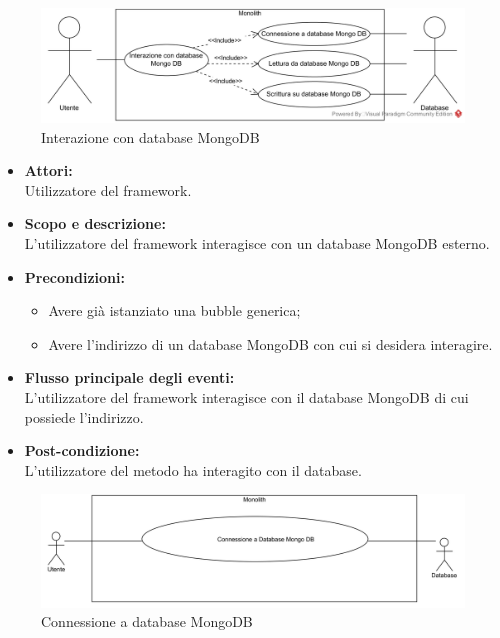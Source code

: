 
\begin{figure}[H]
	\centering
	\includegraphics[width=15cm]{../../documenti/AnalisiDeiRequisiti/Diagrammi_img/Database.png}
	\caption{\UCCaption{} Interazione con database MongoDB}
\end{figure}

\begin{itemize}
	\item \textbf{Attori:}
	\\Utilizzatore del framework.
	\item \textbf{Scopo e descrizione:} 
	\\L'utilizzatore del framework interagisce con un database MongoDB esterno.
	\item \textbf{Precondizioni:}
	\begin{itemize}
		\item Avere già istanziato una bubble generica;
		\item Avere l'indirizzo di un database MongoDB con cui si desidera interagire.
	\end{itemize}
	\item \textbf{Flusso principale degli eventi:}
	\\L'utilizzatore del framework interagisce con il database MongoDB di cui possiede l'indirizzo.
	\item \textbf{Post-condizione:}
	\\L'utilizzatore del metodo ha interagito con il database.
\end{itemize}

\pagebreak


\begin{figure}[H]
	\centering
	\includegraphics[width=15cm]{../../documenti/AnalisiDeiRequisiti/Diagrammi_img/uc1_00.png}
	\caption{\UCFCaption{} Connessione a database MongoDB}
\end{figure}

